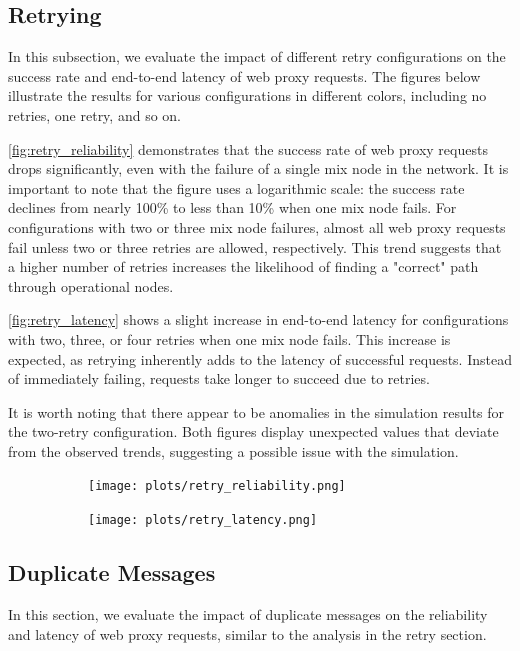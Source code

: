 \documentclass[a4paper,11pt,oneside]{report}
\begin{document}
\subsection{Retrying}

In this subsection, we evaluate the impact of different retry configurations on the success rate and end-to-end latency of web proxy requests. The figures below illustrate the results for various configurations in different colors, including no retries, one retry, and so on.

\autoref{fig:retry_reliability} demonstrates that the success rate of web proxy requests drops significantly, even with the failure of a single mix node in the network. It is important to note that the figure uses a logarithmic scale: the success rate declines from nearly 100\% to less than 10\% when one mix node fails. For configurations with two or three mix node failures, almost all web proxy requests fail unless two or three retries are allowed, respectively. This trend suggests that a higher number of retries increases the likelihood of finding a "correct" path through operational nodes.

\autoref{fig:retry_latency} shows a slight increase in end-to-end latency for configurations with two, three, or four retries when one mix node fails. This increase is expected, as retrying inherently adds to the latency of successful requests. Instead of immediately failing, requests take longer to succeed due to retries.

It is worth noting that there appear to be anomalies in the simulation results for the two-retry configuration. Both figures display unexpected values that deviate from the observed trends, suggesting a possible issue with the simulation.

\begin{figure}[H]
    \centering
    \begin{subfigure}{\textwidth}
        \centering
        \texttt{[image: plots/retry\_reliability.png]}
        \caption{}
        \label{fig:retry_reliability}
    \end{subfigure}
    \hfill
    \centering
    \begin{subfigure}{\textwidth}
        \centering
        \texttt{[image: plots/retry\_latency.png]}
        \caption{}
        \label{fig:retry_latency}
    \end{subfigure}
\end{figure}

\subsection{Duplicate Messages}
In this section, we evaluate the impact of duplicate messages on the reliability and latency of web proxy requests, similar to the analysis in the retry section.
\end{document}
